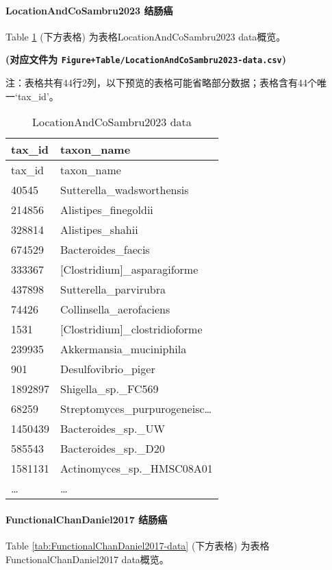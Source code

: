\documentclass[
]{article}
\begin{document}
\hypertarget{locationandcosambru2023-ux7ed3ux80a0ux764c}{%
\paragraph{LocationAndCoSambru2023 结肠癌}\label{locationandcosambru2023-ux7ed3ux80a0ux764c}}

Table \ref{tab:LocationAndCoSambru2023-data} (下方表格) 为表格LocationAndCoSambru2023 data概览。

\textbf{(对应文件为 \texttt{Figure+Table/LocationAndCoSambru2023-data.csv})}

\begin{center}\begin{tcolorbox}[colback=gray!10, colframe=gray!50, width=0.9\linewidth, arc=1mm, boxrule=0.5pt]注：表格共有44行2列，以下预览的表格可能省略部分数据；表格含有44个唯一`tax\_id'。
\end{tcolorbox}
\end{center}

\begin{longtable}[]{@{}ll@{}}
\caption{\label{tab:LocationAndCoSambru2023-data}LocationAndCoSambru2023 data}\tabularnewline
\toprule
tax\_id & taxon\_name\tabularnewline
\midrule
\endfirsthead
\toprule
tax\_id & taxon\_name\tabularnewline
\midrule
\endhead
40545 & Sutterella\_wadsworthensis\tabularnewline
214856 & Alistipes\_finegoldii\tabularnewline
328814 & Alistipes\_shahii\tabularnewline
674529 & Bacteroides\_faecis\tabularnewline
333367 & {[}Clostridium{]}\_asparagiforme\tabularnewline
437898 & Sutterella\_parvirubra\tabularnewline
74426 & Collinsella\_aerofaciens\tabularnewline
1531 & {[}Clostridium{]}\_clostridioforme\tabularnewline
239935 & Akkermansia\_muciniphila\tabularnewline
901 & Desulfovibrio\_piger\tabularnewline
1892897 & Shigella\_sp.\_FC569\tabularnewline
68259 & Streptomyces\_purpurogeneisc\ldots{}\tabularnewline
1450439 & Bacteroides\_sp.\_UW\tabularnewline
585543 & Bacteroides\_sp.\_D20\tabularnewline
1581131 & Actinomyces\_sp.\_HMSC08A01\tabularnewline
\ldots{} & \ldots{}\tabularnewline
\bottomrule
\end{longtable}

\hypertarget{functionalchandaniel2017-ux7ed3ux80a0ux764c}{%
\paragraph{FunctionalChanDaniel2017 结肠癌}\label{functionalchandaniel2017-ux7ed3ux80a0ux764c}}

Table \ref{tab:FunctionalChanDaniel2017-data} (下方表格) 为表格FunctionalChanDaniel2017 data概览。
\end{document}
